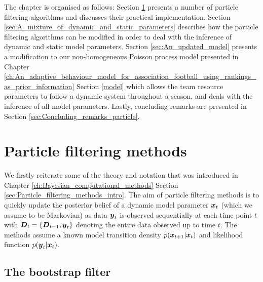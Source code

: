 The chapter is organised as follows: Section \ref{sec:Particle_filtering_methods} presents a number of particle
filtering algorithms and discusses their practical implementation. Section
\ref{sec:A_mixture_of_dynamic_and_static_parameters} describes how the particle filtering algorithms can be modified in
order to deal with the inference of dynamic and static model parameters. Section \ref{sec:An_updated_model} presents a
modification to our non-homogeneous Poisson process model presented in Chapter
\ref{ch:An_adaptive_behaviour_model_for_association_football_using_rankings_as_prior_information} Section \ref{model}
which allows the team resource parameters to follow a dynamic system throughout a season, and deals with the inference
of all model parameters. Lastly, concluding remarks are presented in Section \ref{sec:Concluding_remarks_particle}.

\section{Particle filtering methods}
\label{sec:Particle_filtering_methods}

We firstly reiterate some of the theory and notation that was introduced in Chapter
\ref{ch:Bayesian_computational_methods} Section \ref{sec:Particle_filtering_methods_intro}. The aim of particle
filtering methods is to quickly update the posterior belief of a dynamic model parameter \(\boldsymbol{x}_t\) (which we assume
to be Markovian) as data \(\boldsymbol{y}_t\) is observed sequentially at each time point \(t\) with \(\boldsymbol{D}_t = \{\boldsymbol{D}_{t-1},
\boldsymbol{y}_t\}\) denoting the entire data observed up to time \(t\). The methods assume a known model transition density
\(p(\boldsymbol{x}_{t+1} | \boldsymbol{x}_t)\) and likelihood function \(p(\boldsymbol{y}_t | \boldsymbol{x}_t)\).

\subsection{The bootstrap filter}

